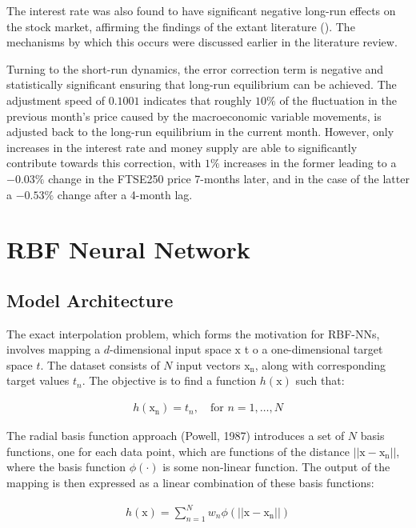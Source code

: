 \documentclass[11pt,a4paper]{article}
\begin{document}
The interest rate was also found to have significant negative long-run effects on the 
stock market, affirming the findings of the extant literature ().
The mechanisms by which this occurs were discussed earlier in the literature review.


Turning to the short-run dynamics, the error correction term 
is negative and statistically significant ensuring that long-run equilibrium 
can be achieved. The adjustment speed of $0.1001$ indicates that 
roughly $10\%$ of the fluctuation in the previous month's price caused by the 
macroeconomic variable movements, is adjusted back to the long-run equilibrium in the current month.
However, only increases in the interest rate and money supply are able to 
significantly contribute towards this correction, with $1\%$ increases in the former 
leading to a $-0.03\%$ change in the FTSE250 price 7-months later, and in the case of the latter
a $-0.53\%$ change after a 4-month lag. 

\section{RBF Neural Network}

\subsection{Model Architecture}

The exact interpolation problem, which forms the motivation for RBF-NNs, 
involves mapping a $d$-dimensional input space $\boldsymbol{\mathrm{x}}$ t
o a one-dimensional target space $t$. The dataset consists of $N$ input
 vectors $\boldsymbol{\mathrm{x_n}}$, along with corresponding target 
 values $t_n$. The objective is to find a function
  $h(\boldsymbol{\mathrm{x}})$ such that:


\begin{align}
  h(\boldsymbol{\mathrm{x_n}}) = t_n, \quad \text{for } n = 1, \ldots, N
\end{align}

The radial basis function approach (Powell, 1987) 
introduces a set of $N$ basis functions, one for each 
data point, which are functions of the distance
$||\boldsymbol{\mathrm{x}} - \boldsymbol{\mathrm{x_n}}||$, where
the basis function $\phi(\cdot)$ is some non-linear function. The output of the mapping is then expressed as a linear combination of these basis functions:

\begin{align}
    h(\boldsymbol{\mathrm{x}}) = \sum_{n=1}^{N} w_n \phi(||\boldsymbol{\mathrm{x}} - \boldsymbol{\mathrm{x_n}}||)
\end{align}
\end{document}

